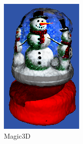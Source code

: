 \begin{figure}[ht]
\begin{subfigure}[b]{0.188\textwidth}
        \includegraphics[width=\textwidth]{figures/subjective/59_part1.png}
        \vspace{0.1cm}
        \caption{Magic3D}
    \end{subfigure}
    \begin{subfigure}[b]{0.22\textwidth}
        \centering

\end{subfigure}
\end{figure}

